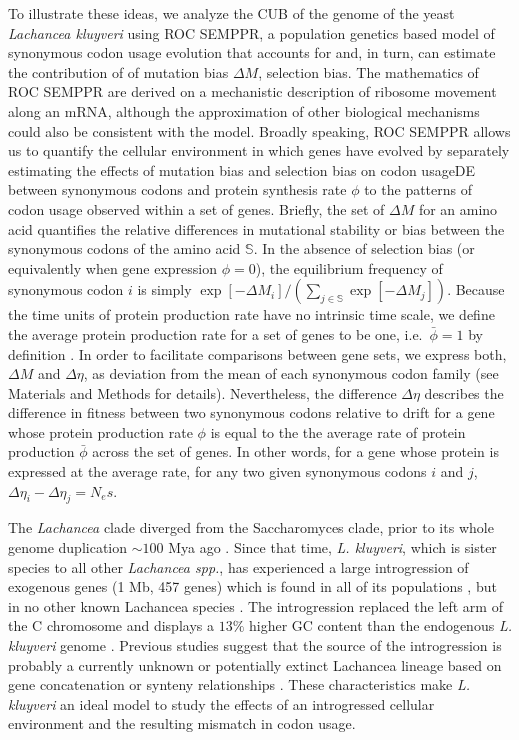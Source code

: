 \documentclass[doublespacing,linenumbers]{bmcart-modified}
\newcommand{\kluyveri}{\textit{L. kluyveri}\xspace}
\newcommand{\ROC}{ROC SEMPPR\xspace}
\newcommand{\GC}{GC content\xspace}
\newcommand{\DM}{\ensuremath{{\Delta M}}\xspace}
\newcommand{\DE}{\ensuremath{{\Delta \eta}}\xspace}
\newcommand{\Ne}{\ensuremath{N_e}\xspace}
\newcommand{\setS}{\ensuremath{\mathbb{S}}\xspace}
\newcommand{\barphi}{\ensuremath{\bar{\phi}}\xspace}
\begin{document}
To illustrate these ideas, we analyze the CUB of the genome of the yeast \emph{Lachancea kluyveri} using \ROC, a population genetics based model of synonymous codon usage evolution that accounts for and, in turn, can estimate the contribution of of mutation bias \DM, selection bias.
The mathematics of \ROC are derived on a mechanistic description of ribosome movement along an mRNA, although the approximation of other biological mechanisms could also be consistent with the model.
Broadly speaking, \ROC allows us to quantify the cellular environment in which genes have evolved by separately estimating the effects of mutation bias and selection bias on codon usageDE between synonymous codons and protein synthesis rate $\phi$ to the patterns of codon usage observed within a set of genes.
Briefly, the set of \DM for an amino acid quantifies the relative differences in mutational stability or bias between the synonymous codons of the amino acid \setS.
In the absence of selection bias (or equivalently when gene expression $\phi = 0$), the equilibrium frequency of synonymous codon $i$ is simply $\exp[-\DM_i]/\left(\sum_{j \in \setS}\exp[-\DM_j]\right)$.
Because the time units of protein production rate have no intrinsic time scale, we define the average protein production rate for a set of genes to be one, i.e.~$\barphi = 1$ by definition \citep{gilchrist2015}. 
In order to facilitate comparisons between gene sets, we express both, \DM and \DE, as deviation from the mean of each synonymous codon family (see Materials and Methods for details).
Nevertheless, the difference \DE describes the difference in fitness between two synonymous codons relative to drift for a gene whose protein production rate $\phi$ is equal to the the average rate of protein production $\barphi$ across the set of genes.
In other words, for a gene whose protein is expressed at the average rate, for any two given synonymous codons $i$ and $j$,  $\DE_i-\DE_j = \Ne s$.

The \textit{Lachancea} clade diverged from the Saccharomyces clade, prior to its whole genome duplication $\sim 100$ Mya ago \citep{MHM2015,Beimforde2014}. 
Since that time, \kluyveri, which is sister species to all other \emph{Lachancea spp.},  has experienced a large introgression of exogenous genes (1 Mb, 457 genes) which is found in all of its populations \citep{payen2009,friedrich2015}, but in no other known Lachancea species \citep{vakirlis2016}.
The introgression replaced the left arm of the C chromosome and displays a $13 \%$ higher \GC than the endogenous \kluyveri genome \citep{payen2009, friedrich2015}.
Previous studies suggest that the source of the introgression is probably a currently unknown or potentially extinct Lachancea lineage based on gene concatenation or synteny relationships \citep{payen2009, friedrich2015, vakirlis2016, brion2017}.
These characteristics make \kluyveri an ideal model to study the effects of an introgressed cellular environment and the resulting mismatch in codon usage.
\end{document}
